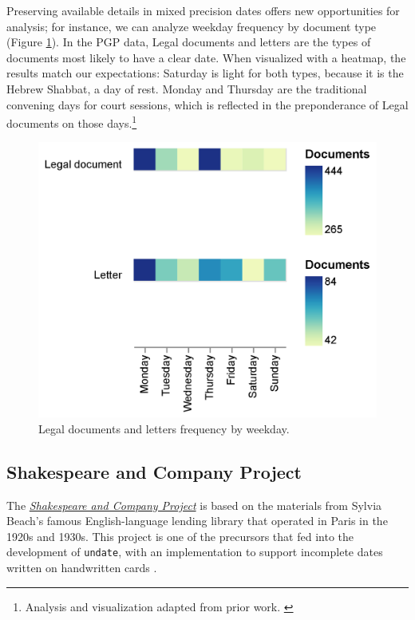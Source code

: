 \documentclass[final]{anthology-ch} %
\begin{document}


Preserving available details in mixed precision dates offers new opportunities for analysis; for instance, we can analyze weekday frequency by document type (Figure \ref{fig:pgp-weekday-frequency}). In the PGP data, Legal documents and letters are the types of documents most likely to have a clear date. When visualized with a heatmap, the results match our expectations: Saturday is light for both types, because it is the Hebrew Shabbat, a day of rest. Monday and Thursday are the traditional convening days for court sessions, which is reflected in the preponderance of Legal documents on those days.\footnote{Analysis and visualization adapted from prior work. \cite{koeser_undate_2025}}

\begin{figure}[h]
  \centering
  \includegraphics[width=0.4\linewidth]{figures/pgp_letters_legaldocs_weekday.png}
  \caption{Legal documents and letters frequency by weekday. }
  \label{fig:pgp-weekday-frequency}
\end{figure}


\subsection{Shakespeare and Company
Project}\label{shakespeare-and-company-project}

The \href{https://shakespeareandco.princeton.edu/}{\textit{Shakespeare and Company
Project}} is based on the materials from Sylvia Beach's famous
English-language lending library that operated in Paris in the 1920s
and 1930s. This project is one of the precursors that fed into the development of \texttt{undate}, with
an implementation to support incomplete dates written on handwritten cards \cite{kotin_shakespeare_2022, koeser_coding_2019}.
\end{document}

